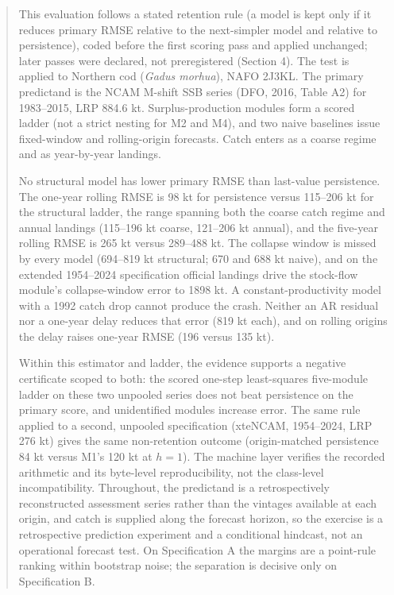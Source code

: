 \documentclass[11pt]{article}
\begin{document}
\begin{abstract}


This evaluation follows a stated retention rule (a model is kept only if
it reduces primary RMSE relative to the next-simpler model and relative
to persistence), coded before the first scoring pass and applied
unchanged; later passes were declared, not preregistered (Section 4).
The test is applied to Northern cod (\emph{Gadus morhua}), NAFO 2J3KL.
The primary predictand is the NCAM M-shift SSB series (DFO, 2016, Table
A2) for 1983--2015, LRP 884.6 kt. Surplus-production modules form a
scored ladder (not a strict nesting for M2 and M4), and two naive
baselines issue fixed-window and rolling-origin forecasts. Catch enters
as a coarse regime and as year-by-year landings.

No structural model has lower primary RMSE than last-value persistence.
The one-year rolling RMSE is 98 kt for persistence versus 115--206 kt
for the structural ladder, the range spanning both the coarse catch
regime and annual landings (115--196 kt coarse, 121--206 kt annual), and
the five-year rolling RMSE is 265 kt versus 289--488 kt. The collapse window
is missed by every model (694--819 kt structural; 670 and 688 kt naive),
and on the extended 1954--2024 specification official landings drive the
stock-flow module's collapse-window error to 1898 kt. A
constant-productivity model with a 1992 catch drop cannot produce the
crash. Neither an AR residual nor a one-year delay reduces that error
(819 kt each), and on rolling origins the delay raises one-year RMSE
(196 versus 135 kt).

Within this estimator and ladder, the evidence supports a negative
certificate scoped to both: the scored one-step least-squares
five-module ladder on these two unpooled series does not beat
persistence on the primary score, and unidentified modules increase
error. The same rule applied to a second, unpooled specification
(xteNCAM, 1954--2024, LRP 276 kt) gives the same non-retention outcome
(origin-matched persistence 84 kt versus M1's 120 kt at \(h=1\)). The
machine layer verifies the recorded arithmetic and its byte-level
reproducibility, not the class-level incompatibility. Throughout, the
predictand is a retrospectively reconstructed assessment series rather
than the vintages available at each origin, and catch is supplied along
the forecast horizon, so the exercise is a retrospective prediction
experiment and a conditional hindcast, not an operational forecast test.
On Specification A the margins are a point-rule ranking within
bootstrap noise; the separation is decisive only on Specification B.

\end{abstract}
\end{document}
